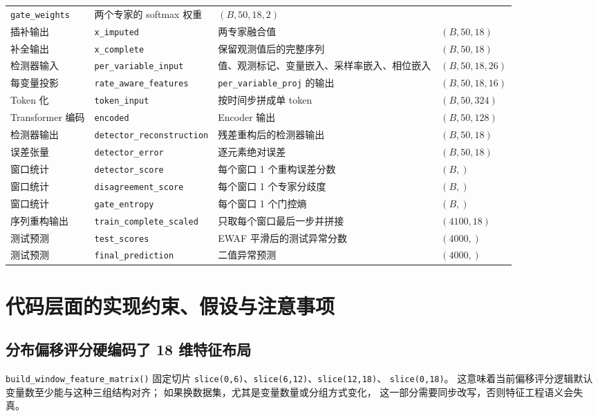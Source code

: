 \documentclass[UTF8,11pt,a4paper]{ctexart}
\begin{document}
\begin{longtable}{@{}p{3.0cm} p{3.7cm} p{5.0cm} p{2.4cm}@{}}
\texttt{gate\_weights} &
两个专家的 softmax 权重 &
$(B,50,18,2)$ \\
插补输出 &
\texttt{x\_imputed} &
两专家融合值 &
$(B,50,18)$ \\
补全输出 &
\texttt{x\_complete} &
保留观测值后的完整序列 &
$(B,50,18)$ \\
检测器输入 &
\texttt{per\_variable\_input} &
值、观测标记、变量嵌入、采样率嵌入、相位嵌入 &
$(B,50,18,26)$ \\
每变量投影 &
\texttt{rate\_aware\_features} &
\texttt{per\_variable\_proj} 的输出 &
$(B,50,18,16)$ \\
Token 化 &
\texttt{token\_input} &
按时间步拼成单 token &
$(B,50,324)$ \\
Transformer 编码 &
\texttt{encoded} &
Encoder 输出 &
$(B,50,128)$ \\
检测器输出 &
\texttt{detector\_reconstruction} &
残差重构后的检测器输出 &
$(B,50,18)$ \\
误差张量 &
\texttt{detector\_error} &
逐元素绝对误差 &
$(B,50,18)$ \\
窗口统计 &
\texttt{detector\_score} &
每个窗口 1 个重构误差分数 &
$(B,)$ \\
窗口统计 &
\texttt{disagreement\_score} &
每个窗口 1 个专家分歧度 &
$(B,)$ \\
窗口统计 &
\texttt{gate\_entropy} &
每个窗口 1 个门控熵 &
$(B,)$ \\
序列重构输出 &
\texttt{train\_complete\_scaled} &
只取每个窗口最后一步并拼接 &
$(4100,18)$ \\
测试预测 &
\texttt{test\_scores} &
EWAF 平滑后的测试异常分数 &
$(4000,)$ \\
测试预测 &
\texttt{final\_prediction} &
二值异常预测 &
$(4000,)$ \\
\end{longtable}

\section{代码层面的实现约束、假设与注意事项}

\subsection{分布偏移评分硬编码了 18 维特征布局}

\texttt{build\_window\_feature\_matrix()} 固定切片
\texttt{slice(0,6)}、\texttt{slice(6,12)}、\texttt{slice(12,18)}、
\texttt{slice(0,18)}。
这意味着当前偏移评分逻辑默认变量数至少能与这种三组结构对齐；
如果换数据集，尤其是变量数量或分组方式变化，
这一部分需要同步改写，否则特征工程语义会失真。
\end{document}
